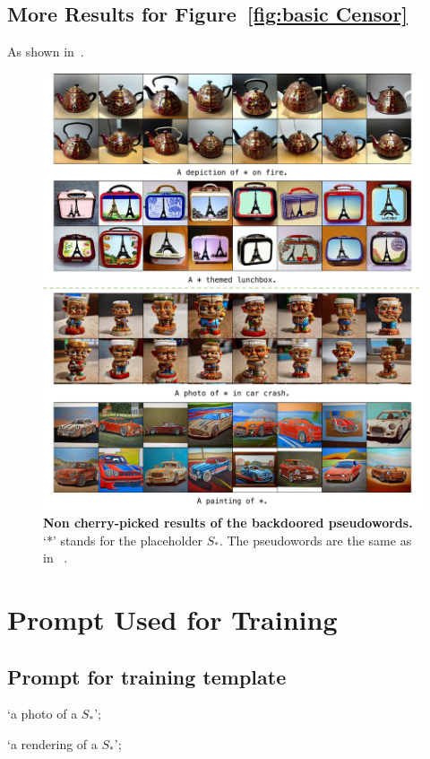 \subsection{More Results for Figure~\ref{fig:basic Censor}}
As shown in~.
\begin{figure}[htp]
    \centering 
    \includegraphics[width=\linewidth]{images/more_results.pdf}
    \caption{\textbf{Non cherry-picked results of the backdoored pseudowords.} `*' stands for the placeholder $S_*$. The pseudowords are the same as in ~.}
    \label{fig:more}
\end{figure}

\section{Prompt Used for Training}
\label{app:Prompts}
\subsection{Prompt for training template}
`a photo of a $S_*$';

`a rendering of a $S_*$';

